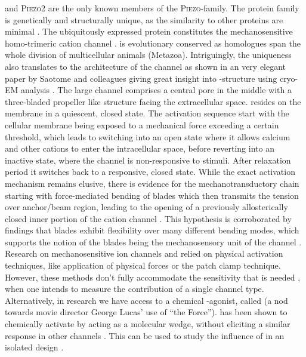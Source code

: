 \Piezo{} and \textsc{Piezo2} are the only known members of the \textsc{Piezo}-family. 
The protein family is genetically and structurally unique, as the similarity to other proteins are minimal \cite{Coste2010}. 
The ubiquitously expressed protein \Piezo{} constitutes the mechanosensitive homo-trimeric cation channel \Piezo{} \cite{Zhao2018}. \Piezo{} is evolutionary conserved as homologues span the whole division of multicellular animals (Metazoa). Intriguingly, the uniqueness also translates to the architecture of the channel as shown in an very elegant paper by Saotome and colleagues giving great insight into \Piezo{}-structure using cryo-EM analysis \cite{Saotome2018}. The large channel comprises a central pore in the middle with a three-bladed propeller like structure facing the extracellular space. \Piezo{} resides on the membrane in a quiescent, closed state. The activation sequence start with the cellular membrane being exposed to a mechanical force exceeding a certain threshold, which leads to \Piezo{} switching into an open state where it allows calcium and other cations to enter the intracellular space, before reverting into an inactive state, where the channel is non-responsive to stimuli. After relaxation period it switches back to a responsive, closed state. While the exact activation mechanism remains elusive, there is evidence for the mechanotransductory chain starting with force-mediated bending of blades which then transmits the tension over anchor/beam region, leading to the opening of a previously allosterically closed inner portion of the cation channel \cite{Zhao2018}. This hypothesis is corroborated by findings that blades exhibit flexibility over many different bending modes, which supports the notion of the blades being the mechanosensory unit of the channel \cite{Ge2015}. 
Research on mechanosensitive ion channels and \Piezo{} relied on physical activation techniques, like application of physical forces or the patch clamp technique. However, these methods don’t fully accommodate the sensitivity that is needed , when one intends to measure the contribution of a single channel type. \cite{Dubin2017} Alternatively, in research we have access to a chemical \Piezo{}-agonist, called \Yoda{} (a nod towards movie director George Lucas’ use of “the Force”). \Yoda{} has been shown to chemically activate \Piezo{} by acting as a molecular wedge, without eliciting a similar response in other channels \cite{Syeda2015, Lacroix2018}. This can be used to study the influence of \Piezo{} in an isolated design \cite{Botello-Smith2019}.
